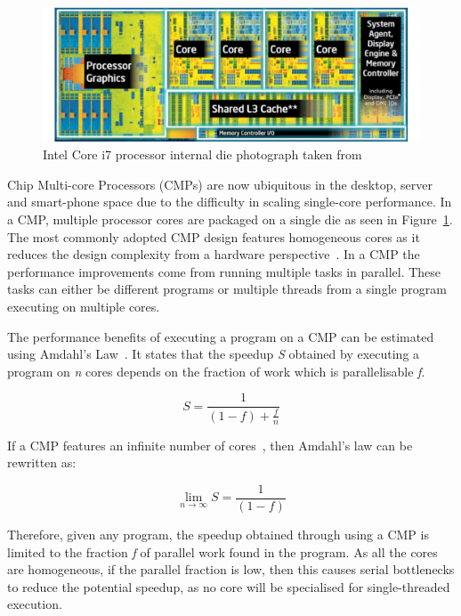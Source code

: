 \begin{figure}[t]
 \center
 \includegraphics[width=1\textwidth]{background/graphics/i7intel.pdf}
 \caption{Intel Core i7 processor internal die photograph taken from~\cite{turleywhite}}\label{fig:i7}
\end{figure}
 
Chip Multi-core Processors (CMPs) are now ubiquitous in the desktop, server and smart-phone space due to the difficulty in scaling single-core performance.
In a CMP, multiple processor cores are packaged on a single die as seen in Figure~\ref{fig:i7}.
The most commonly adopted CMP design features homogeneous cores as it reduces the design complexity from a hardware perspective~\cite{asanovic2006landscape}.
In a CMP the performance improvements come from running multiple tasks in parallel.
These tasks can either be different programs or multiple threads from a single program executing on multiple cores.

The performance benefits of executing a program on a CMP can be estimated using Amdahl's Law~\cite{amdahl1967validity}.
It states that the speedup \textit{S} obtained by executing a program on \textit{n} cores depends on the fraction of work which is parallelisable \textit{f}.

\begin{equation}
S = \frac{1}{(1-f) + \frac{f}{n}}
\end{equation}\label{amdlaw}

If a CMP features an infinite number of cores~\cite{eyerman2010amdahl}, then Amdahl's law can be rewritten as:

\begin{equation}
\lim_{n\to\infty} S = \frac{1}{(1-f)}
\end{equation}

Therefore, given any program, the speedup obtained through using a CMP is limited to the fraction \textit{f} of parallel work found in the program.
As all the cores are homogeneous, if the parallel fraction is low, then this causes serial bottlenecks to reduce the potential speedup, as no core will be specialised for single-threaded execution.
